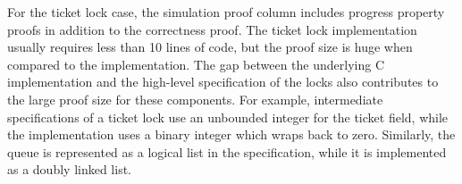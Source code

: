 For the ticket lock case, the simulation proof column includes progress property proofs in addition to the correctness proof. 
The ticket lock implementation usually requires less than 10 lines of code, but the proof size is huge when compared to the implementation.
The gap between the underlying C implementation and the high-level specification of the locks also contributes to the large proof size for these components. For example, intermediate specifications of a ticket lock use an unbounded integer for the ticket field, while the implementation uses a binary integer which wraps back to zero. Similarly, the queue is represented as a logical list in the specification, while it is implemented as a doubly linked list.

